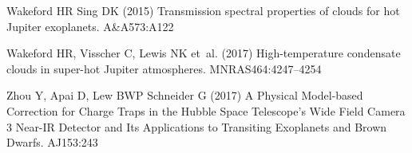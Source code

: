 \documentclass[graybox,natbib,nosecnum]{svmult}
\newcommand*\aap{A\&A}
\newcommand*\aj{AJ}
\newcommand*\mnras{MNRAS}
\begin{document}
\begin{thebibliography}{110}
{Wakeford} HR {Sing} DK (2015) {Transmission spectral properties of clouds for
  hot Jupiter exoplanets}. \aap 573:A122

{Wakeford} HR, {Visscher} C, {Lewis} NK et~al. (2017) {High-temperature
  condensate clouds in super-hot Jupiter atmospheres}. \mnras 464:4247--4254

{Zhou} Y, {Apai} D, {Lew} BWP {Schneider} G (2017) {A Physical Model-based
  Correction for Charge Traps in the Hubble Space Telescope's Wide Field Camera
  3 Near-IR Detector and Its Applications to Transiting Exoplanets and Brown
  Dwarfs}. \aj 153:243

\end{thebibliography}
\end{document}

